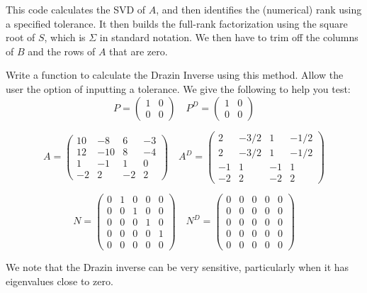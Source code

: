 This code calculates the SVD of $A$, and then identifies the (numerical) rank using a specified tolerance. It then builds the full-rank factorization using the square root of $S$, which is $\Sigma$ in standard notation. We then have to trim off the columns of $B$ and the rows of $A$ that are zero.

\begin{problem}
Write a function to calculate the Drazin Inverse using this method. Allow the user the option of inputting a tolerance. We give the following to help you test:
\[
P = \begin{pmatrix}
1 & 0 \\
0 & 0 
\end{pmatrix} \quad P^D = \begin{pmatrix}
1 & 0 \\
0 & 0 
\end{pmatrix}
\]

\[
A = \begin{pmatrix}
10 & -8 & 6 & -3 \\
12 & -10 & 8 & -4 \\
1 & -1 & 1 & 0 \\
-2 & 2 & -2 & 2
\end{pmatrix} \quad A^D = \begin{pmatrix}
2 & -3/2 & 1 & -1/2 \\
2 & -3/2 & 1 & -1/2 \\
-1 & 1 & -1 & 1 \\
-2 & 2 & -2 & 2
\end{pmatrix}
\]

\[
N = \begin{pmatrix}
0&1&0&0&0 \\
0&0&1&0&0 \\
0&0&0&1&0 \\
0&0&0&0&1 \\
0&0&0&0&0
\end{pmatrix} \quad N^D = \begin{pmatrix}
0&0&0&0&0 \\
0&0&0&0&0 \\
0&0&0&0&0 \\
0&0&0&0&0 \\
0&0&0&0&0
\end{pmatrix}
\]
\end{problem}

We note that the Drazin inverse can be very sensitive, particularly when it has eigenvalues close to zero.

